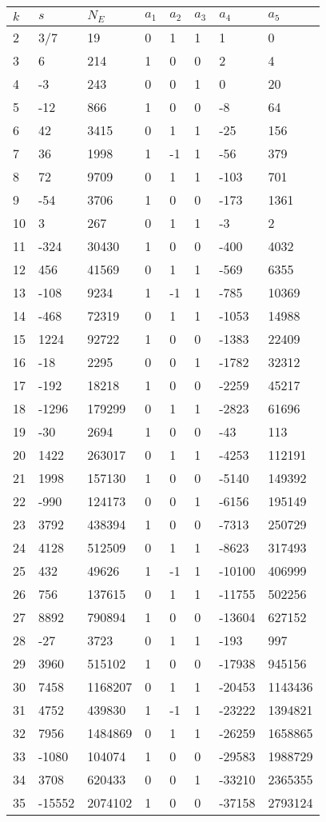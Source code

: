 \documentclass{amsart}
\begin{document}
\begin{longtable}{|l|l|l|lllll|}
\hline
$k$ & $s$ & $N_E$ & $a_1$ & $a_2$ & $a_3$ & $a_4$ & $a_5$\\
\hline
2&3/7&19&0&1&1&1&0\\
3&6&214&1&0&0&2&4\\
4&-3&243&0&0&1&0&20\\
5&-12&866&1&0&0&-8&64\\
6&42&3415&0&1&1&-25&156\\
7&36&1998&1&-1&1&-56&379\\
8&72&9709&0&1&1&-103&701\\
9&-54&3706&1&0&0&-173&1361\\
10&3&267&0&1&1&-3&2\\
11&-324&30430&1&0&0&-400&4032\\
12&456&41569&0&1&1&-569&6355\\
13&-108&9234&1&-1&1&-785&10369\\
14&-468&72319&0&1&1&-1053&14988\\
15&1224&92722&1&0&0&-1383&22409\\
16&-18&2295&0&0&1&-1782&32312\\
17&-192&18218&1&0&0&-2259&45217\\
18&-1296&179299&0&1&1&-2823&61696\\
19&-30&2694&1&0&0&-43&113\\
20&1422&263017&0&1&1&-4253&112191\\
21&1998&157130&1&0&0&-5140&149392\\
22&-990&124173&0&0&1&-6156&195149\\
23&3792&438394&1&0&0&-7313&250729\\
24&4128&512509&0&1&1&-8623&317493\\
25&432&49626&1&-1&1&-10100&406999\\
26&756&137615&0&1&1&-11755&502256\\
27&8892&790894&1&0&0&-13604&627152\\
28&-27&3723&0&1&1&-193&997\\
29&3960&515102&1&0&0&-17938&945156\\
30&7458&1168207&0&1&1&-20453&1143436\\
31&4752&439830&1&-1&1&-23222&1394821\\
32&7956&1484869&0&1&1&-26259&1658865\\
33&-1080&104074&1&0&0&-29583&1988729\\
34&3708&620433&0&0&1&-33210&2365355\\
35&-15552&2074102&1&0&0&-37158&2793124\\

\end{longtable}
\end{document}
